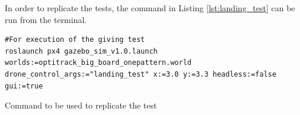 \documentclass[../Head/report.tex]{subfiles}
\begin{document}
In order to replicate the tests, the command in Listing \ref{lst:landing_test} can be run from the terminal.

\begin{listing}[H] 
\begin{tcolorbox}[
    enhanced,
    attach boxed title to top left={xshift=6mm,yshift=-3mm},
    colback=lightgreen!20,
    colframe=lightgreen,
    fonttitle=\bfseries\color{black},
]
\begin{verbatim}
#For execution of the giving test
roslaunch px4 gazebo_sim_v1.0.launch worlds:=optitrack_big_board_onepattern.world drone_control_args:="landing_test" x:=3.0 y:=3.3 headless:=false gui:=true
\end{verbatim}
\end{tcolorbox}
\caption{Command to be used to replicate the test}
\label{lst:landing_test}    
\end{listing} 
\end{document}
